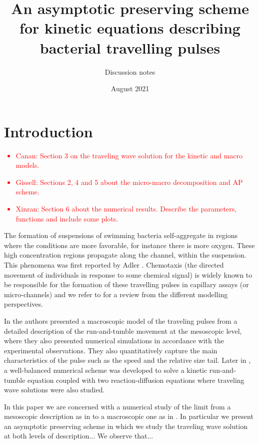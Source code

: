 \documentclass[11pt,twoside]{article}
\title{An asymptotic preserving scheme for kinetic equations describing bacterial travelling pulses}
\author{Discussion notes}
\date{August 2021}
\numberwithin{equation}{section}
\begin{document}
\maketitle



\section{Introduction}
\textcolor{red}{\begin{itemize}
    \item Canan: Section 3 on the traveling wave solution for the kinetic and macro models.
    \item Gissell: Sections 2, 4 and 5 about the micro-macro decomposition and AP scheme.
    \item Xinran: Section 6 about the numerical results. Describe the parameters, functions and include some plots.
\end{itemize}}


The formation of suspensions of swimming bacteria self-aggregate in regions where the conditions are more favorable, for instance there is more oxygen. These high concentration regions propagate along the channel, within the suspension. This phenomena was first reported by Adler \cite{adler1976chemotaxis}. Chemotaxis (the directed movement of individuals in response to some chemical signal) is widely known to be responsible for the formation of these travelling pulses in capillary assays (or micro-channels) and we refer to \cite{tindall2008overview} for a review from the different modelling perspectives. 

In \cite{saragosti2010mathematical} the authors presented a macroscopic model of the traveling pulses from a detailed description of the run-and-tumble movement at the mesoscopic level, where they also presented numerical simulations in accordance with the experimental observations. They also quantitatively capture the main characteristics of the pulse such as the speed and the relative size tail. Later in \cite{calvez2018well}, a well-balanced numerical scheme was developed to solve a kinetic run-and-tumble equation coupled with two reaction-diffusion equations where traveling wave solutions were also studied. 

In this paper we are concerned with a numerical study of the limit from a mesoscopic  description as in \cite{calvez2018well} to a macroscopic one as in \cite{saragosti2010mathematical}. In particular we present an asymptotic preserving scheme in which we study the traveling wave solution at both levels of description... We observe that...
\end{document}
